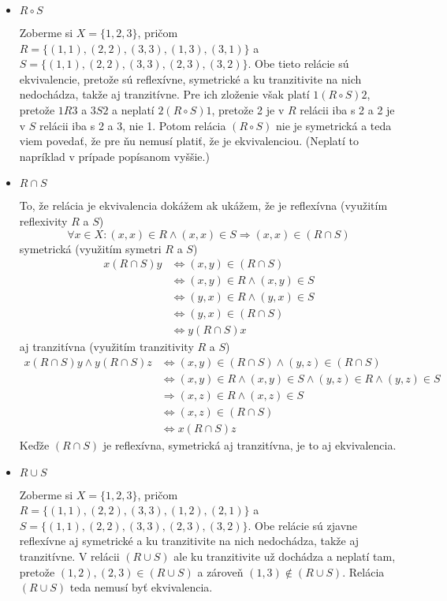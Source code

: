 
\begin{itemize}
    \item $R\circ S$

    Zoberme si $X=\{1,2,3\}$, pričom $R=\{(1,1), (2,2), (3,3), 
    (1,3), (3,1)\}$ a $S=\{(1,1), (2,2), (3,3),\allowbreak (2,3), (3,2)\}$. 
    Obe tieto relácie sú ekvivalencie, pretože sú reflexívne, 
    symetrické a ku tranzitivite na nich nedochádza, takže aj 
    tranzitívne. Pre ich zloženie však platí $1(R\circ S)2$, pretože 
    $1R3$ a $3S2$ a neplatí $2(R\circ S)1$, pretože 2 je v $R$ 
    relácii iba s 2 a 2 je v $S$ relácii iba s 2 a 3, nie 1. Potom 
    relácia $(R\circ S)$ nie je symetrická a teda viem povedať, že 
    pre ňu nemusí platiť, že je ekvivalenciou. (Neplatí to napríklad 
    v prípade popísanom vyššie.)
    \item $R\cap S$

    To, že relácia je ekvivalencia dokážem ak ukážem, že je 
    reflexívna (využitím reflexivity $R$ a $S$)
    \[\forall x\in X: (x,x)\in R\wedge (x,x)\in S\Rightarrow 
    (x,x)\in (R\cap S)\]
    symetrická (využitím symetri $R$ a $S$)
    \begin{align*}
        x(R\cap S)y&\Leftrightarrow (x,y)\in (R\cap S)\\
        &\Leftrightarrow (x,y)\in R\wedge (x,y)\in S\\
        &\Leftrightarrow (y,x)\in R\wedge (y,x)\in S\\
        &\Leftrightarrow (y,x)\in (R\cap S)\\
        &\Leftrightarrow y(R\cap S)x
    \end{align*}
    aj tranzitívna (využitím tranzitivity $R$ a $S$)
    \begin{align*}
        x(R\cap S)y\wedge y(R\cap S)z&\Leftrightarrow 
        (x,y)\in (R\cap S)\wedge (y,z)\in (R\cap S)\\
        &\Leftrightarrow (x,y)\in R\wedge (x,y)\in S\wedge
        (y,z)\in R\wedge (y,z)\in S\\
        &\Rightarrow (x,z)\in R\wedge (x,z)\in S\\
        &\Leftrightarrow (x,z)\in (R\cap S)\\
        &\Leftrightarrow x(R\cap S)z
    \end{align*}
    Keďže $(R\cap S)$ je reflexívna, symetrická aj tranzitívna, je 
    to aj ekvivalencia.
    \item $R\cup S$

    Zoberme si $X=\{1,2,3\}$, pričom $R=\{(1,1), (2,2), (3,3), 
    (1,2), (2,1)\}$ a $S=\{(1,1), (2,2), (3,3),\allowbreak (2,3), (3,2)\}$. 
    Obe relácie sú zjavne reflexívne aj symetrické a ku tranzitivite 
    na nich nedochádza, takže aj tranzitívne. V relácii $(R\cup S)$ 
    ale ku tranzitivite už dochádza a neplatí tam, pretože 
    $(1,2), (2,3)\in (R\cup S)$ a zároveň $(1,3)\notin (R\cup S)$.
    Relácia $(R\cup S)$ teda nemusí byť ekvivalencia.
\end{itemize}

